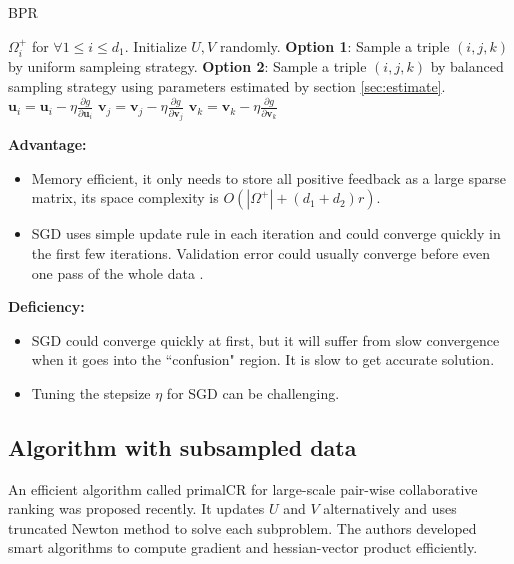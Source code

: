 \documentclass{article}
\numberwithin{equation}{section}
\newtheorem{sampling strategy}{Sampling Strategy}
\begin{document}
\begin{algorithm}[H]
   \caption{BPR}
   \label{alg:bpr}
\begin{algorithmic}
    $\Omega_i^+$ for $\forall 1 \leq i \leq d_1$.
   \STATE Initialize $U,V$ randomly.
   \REPEAT
   \STATE \textbf{Option 1}: Sample a triple $(i,j,k)$ by uniform sampleing strategy.
   \STATE \textbf{Option 2}: Sample a triple $(i,j,k)$ by balanced sampling strategy using parameters estimated by section \ref{sec:estimate}.
   \STATE $\displaystyle \bm{u}_i = \bm{u}_i - \eta \frac{\partial g}{ \partial \bm{u}_i }$
   \STATE $\displaystyle \bm{v}_j = \bm{v}_j - \eta \frac{\partial g}{ \partial \bm{v}_j }$
   \STATE $\displaystyle \bm{v}_k = \bm{v}_k - \eta \frac{\partial g}{ \partial \bm{v}_k }$
\end{algorithmic}
\end{algorithm}

\textbf{Advantage: } 

\begin{itemize}
    \item Memory efficient, it only needs to store all positive feedback as a large sparse matrix, its space complexity is $O(|\Omega^+| + (d_1 + d_2)r)$. 
    \item SGD uses simple update rule in each iteration and could converge quickly in the first few iterations. Validation error could usually converge before even one pass of the whole data \cite{bpr}.
\end{itemize}

\textbf{Deficiency:}

\begin{itemize}
    \item SGD could converge quickly at first, but it will suffer from slow convergence when it goes into the ``confusion" region. It is slow to get accurate solution.
    \item Tuning the stepsize $\eta$ for SGD can be challenging.
\end{itemize}

\subsection{Algorithm with subsampled data}

An efficient algorithm called \textsf{primalCR} \cite{crlinear} for large-scale pair-wise collaborative ranking was proposed recently. It updates $U$ and $V$ alternatively and uses truncated Newton method to solve each subproblem. The authors developed smart algorithms to compute gradient and hessian-vector product efficiently.
\end{document}
